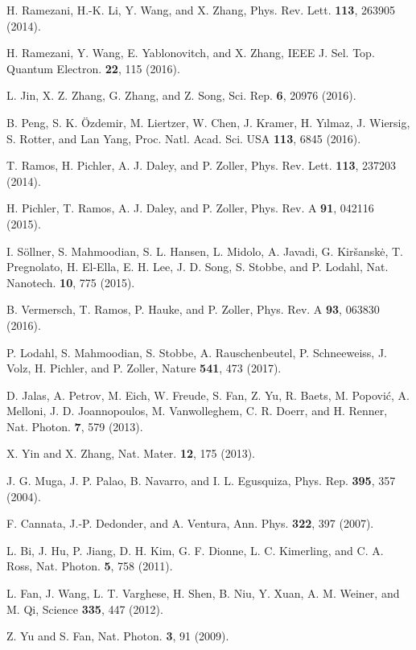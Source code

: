 \documentclass[prl,showpacs,superscriptaddress,twocolumn]{revtex4-1}
\begin{document}
\begin{thebibliography}{999}
 H. Ramezani, H.-K. Li, Y. Wang, and X. Zhang, Phys. Rev. Lett.
\textbf{113}, 263905 (2014).

 H. Ramezani, Y. Wang, E. Yablonovitch, and X. Zhang, IEEE J.
Sel. Top. Quantum Electron. \textbf{22}, 115 (2016).

 L. Jin, X. Z. Zhang, G. Zhang, and Z. Song, Sci. Rep.
\textbf{6}, 20976 (2016).

 B. Peng, S. K. \"{O}zdemir, M. Liertzer, W. Chen, J.
Kramer, H. Y\i lmaz, J. Wiersig, S. Rotter, and Lan Yang, Proc. Natl. Acad.
Sci. USA \textbf{113}, 6845 (2016).

 T. Ramos, H. Pichler, A. J. Daley, and P. Zoller, Phys. Rev.
Lett. \textbf{113}, 237203 (2014).

 H. Pichler, T. Ramos, A. J. Daley, and P. Zoller, Phys. Rev.
A \textbf{91}, 042116 (2015).

 I. S\"{o}llner, S. Mahmoodian, S. L. Hansen, L. Midolo, A.
Javadi, G. Kir\v{s}ansk\.{e}, T. Pregnolato, H. El-Ella, E. H. Lee, J. D.
Song, S. Stobbe, and P. Lodahl, Nat. Nanotech. \textbf{10}, 775 (2015).

 B. Vermersch, T. Ramos, P. Hauke, and P. Zoller, Phys. Rev.
A \textbf{93}, 063830 (2016).

 P. Lodahl, S. Mahmoodian, S. Stobbe, A. Rauschenbeutel, P.
Schneeweiss, J. Volz, H. Pichler, and P. Zoller, Nature \textbf{541}, 473
(2017).

 D. Jalas, A. Petrov, M. Eich, W. Freude, S. Fan, Z. Yu, R.
Baets, M. Popovi\'{c}, A. Melloni, J. D. Joannopoulos, M. Vanwolleghem, C.
R. Doerr, and H. Renner, Nat. Photon. \textbf{7}, 579 (2013).

 X. Yin and X. Zhang, Nat. Mater. \textbf{12}, 175 (2013).

 J. G. Muga, J. P. Palao, B. Navarro, and I. L. Egusquiza,
Phys. Rep. \textbf{395}, 357 (2004).

 F. Cannata, J.-P. Dedonder, and A. Ventura, Ann.
Phys. \textbf{322}, 397 (2007).

 L. Bi, J. Hu, P. Jiang, D. H. Kim, G. F. Dionne, L. C.
Kimerling, and C. A. Ross, Nat. Photon. \textbf{5}, 758 (2011).

 L. Fan, J. Wang, L. T. Varghese, H. Shen, B. Niu, Y. Xuan, A.
M. Weiner, and M. Qi, Science \textbf{335}, 447 (2012).

 Z. Yu and S. Fan, Nat. Photon. \textbf{3}, 91 (2009).


\end{thebibliography}
\end{document}
